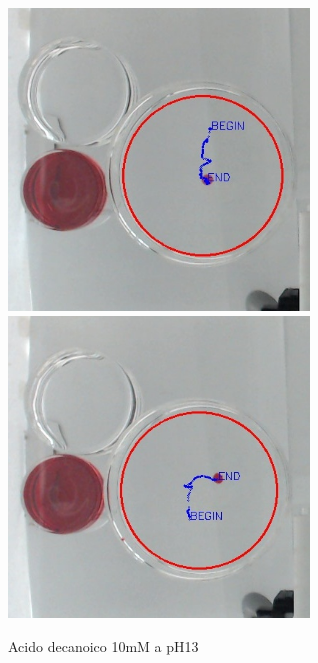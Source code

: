 \begin{figure}[h]
	\centering
   		{\includegraphics[width=8cm]{immagini/10mMpH13-2.jpg}}
 	\hspace{2mm}   	
		{\includegraphics[width=8cm]{immagini/10mMpH13-1.jpg}}
	\caption{Acido decanoico 10mM a pH13}
\end{figure}   
